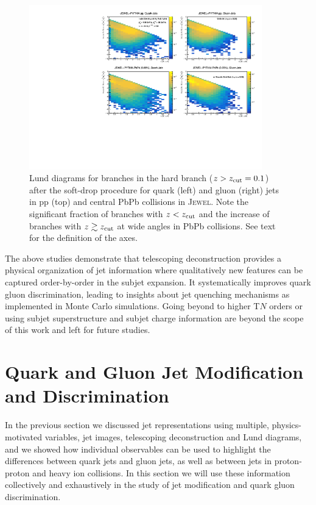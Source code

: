 \documentclass[notoc,preprintnumbers]{JHEP3}
\begin{document}
\begin{figure}[t]
	   \centering
	   \includegraphics[width=0.9\textwidth]{Fig12}
	   \caption{Lund diagrams for branches in the hard branch ($z>z_{\rm cut}=0.1$) after the soft-drop procedure for quark (left) and gluon (right) jets in pp (top) and central PbPb collisions in \textsc{Jewel}. Note the significant fraction of branches with $z<z_{\rm cut}$ and the increase of branches with $z\gtrsim z_{\rm cut}$ at wide angles in PbPb collisions. See text for the definition of the axes.}
\label{fig:Lund_hard}
\end{figure}

The above studies demonstrate that telescoping deconstruction provides a physical organization of jet information where qualitatively new features can be captured order-by-order in the subjet expansion. It systematically improves quark gluon discrimination, leading to insights about jet quenching mechanisms as implemented in Monte Carlo simulations. Going beyond to higher T$N$ orders or using subjet superstructure \cite{Gallicchio:2010sw} and subjet charge \cite{Krohn:2012fg} information are beyond the scope of this work and left for future studies.

\section{Quark and Gluon Jet Modification and Discrimination}
\label{sec:results}

In the previous section we discussed jet representations using multiple, physics-motivated variables, jet images, telescoping deconstruction and Lund diagrams, and we showed how individual observables can be used to highlight the differences between quark jets and gluon jets, as well as between jets in proton-proton and heavy ion collisions. In this section we will use these information collectively and exhaustively in the study of jet modification and quark gluon discrimination.
\end{document}
